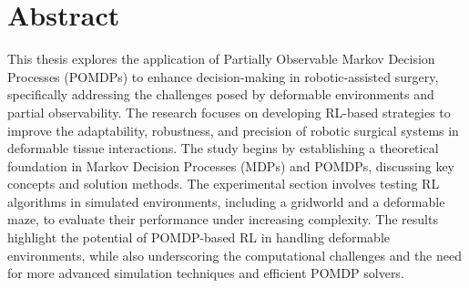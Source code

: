 \chapter*{Abstract}

This thesis explores the application of Partially Observable Markov Decision Processes 
(POMDPs) to enhance decision-making in robotic-assisted surgery, specifically addressing 
the challenges posed by deformable environments and partial observability. 
The research focuses on developing RL-based strategies to improve the adaptability, 
robustness, and precision of robotic surgical systems in deformable tissue interactions. 
The study begins by establishing a theoretical foundation in Markov Decision Processes 
(MDPs) and POMDPs, discussing key concepts and solution methods. The experimental section 
involves testing RL algorithms in simulated environments, including a gridworld and 
a deformable maze, to evaluate their performance under increasing complexity. 
The results highlight the potential of POMDP-based RL in handling deformable environments, 
while also underscoring the computational challenges and the need for more advanced simulation techniques and efficient POMDP solvers.
